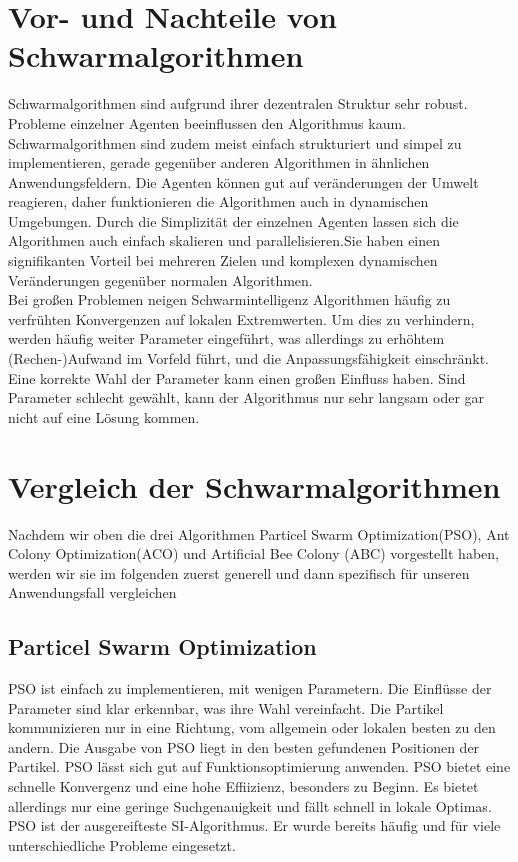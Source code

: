 \section{Vor- und Nachteile von Schwarmalgorithmen}
\label{sec:comparison}
Schwarmalgorithmen sind aufgrund ihrer dezentralen Struktur sehr robust. Probleme einzelner Agenten beeinflussen den Algorithmus kaum. Schwarmalgorithmen sind zudem meist einfach strukturiert und simpel zu implementieren, gerade gegenüber anderen Algorithmen in ähnlichen Anwendungsfeldern. Die Agenten können gut auf veränderungen der Umwelt reagieren, daher funktionieren die Algorithmen auch in dynamischen Umgebungen. Durch die Simplizität der einzelnen Agenten lassen sich die Algorithmen auch einfach skalieren und parallelisieren.Sie haben einen signifikanten Vorteil bei mehreren Zielen und komplexen dynamischen Veränderungen gegenüber normalen Algorithmen. \\

Bei großen Problemen neigen Schwarmintelligenz Algorithmen häufig zu verfrühten Konvergenzen auf lokalen Extremwerten. Um dies zu verhindern, werden häufig weiter Parameter eingeführt, was allerdings zu erhöhtem (Rechen-)Aufwand im Vorfeld führt, und die Anpassungsfähigkeit einschränkt.\cite {wu2022review} Eine korrekte Wahl der Parameter kann einen großen Einfluss haben. Sind Parameter schlecht gewählt, kann der Algorithmus nur sehr langsam oder gar nicht auf eine Lösung kommen.

\section{Vergleich der Schwarmalgorithmen}

Nachdem wir oben die drei Algorithmen Particel Swarm Optimization(PSO), Ant Colony Optimization(ACO) und  Artificial Bee Colony (ABC) vorgestellt haben, werden wir sie im folgenden zuerst generell und dann spezifisch für unseren Anwendungsfall vergleichen\\

\subsection{Particel Swarm Optimization}
PSO ist einfach zu implementieren, mit wenigen Parametern. Die Einflüsse der Parameter sind klar erkennbar, was ihre Wahl vereinfacht. Die Partikel kommunizieren nur in eine Richtung, vom allgemein oder lokalen besten zu den andern. Die Ausgabe von PSO liegt in den besten gefundenen Positionen der Partikel. PSO lässt sich gut auf Funktionsoptimierung anwenden. PSO bietet eine schnelle Konvergenz und eine hohe Effiizienz, besonders zu Beginn. Es bietet allerdings nur eine geringe Suchgenauigkeit und fällt schnell in lokale Optimas. \cite {yu2015swarm} PSO ist der ausgereifteste SI-Algorithmus. Er wurde bereits häufig und für viele unterschiedliche Probleme eingesetzt. 


